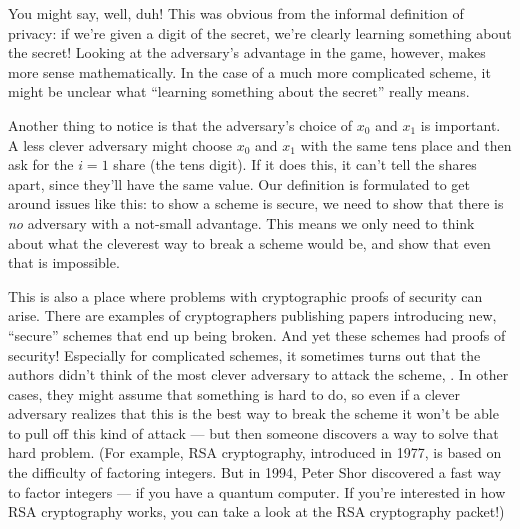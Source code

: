 You might say, well, duh! This was obvious from the informal definition 
of privacy: if we're given a digit of the secret, we're clearly learning 
something about the secret! Looking at the adversary's advantage in the 
game, however, makes more sense mathematically. In the case of a much 
more complicated scheme, it might be unclear what ``learning something 
about the secret'' really means.

Another thing to notice is that the adversary's choice of $x_0$ and $x_1$
is important. A less clever adversary might choose $x_0$ and $x_1$ with 
the same tens place and then ask for the $i=1$ share (the tens digit).
If it does this, it can't tell the shares apart, since they'll have the same
value. Our definition is formulated to get around issues like this: to 
show a scheme is secure, we need to show that there is \emph{no} adversary 
with a not-small advantage. This means we only need to think about what the 
cleverest way to break a scheme would be, and show that even that is 
impossible.

This is also a place where problems with cryptographic proofs of security 
can arise. There are examples of cryptographers publishing papers 
introducing new, ``secure'' schemes that end up being broken. And yet 
these schemes had proofs of security! Especially for complicated schemes, 
it sometimes turns out that the authors didn't think of the most clever 
adversary to attack the scheme, . In other cases, they might assume that 
something is hard to do, so even if a clever adversary realizes that this 
is the best way to break the scheme it won't be able to pull off this 
kind of attack --- but then someone discovers a way to solve that 
hard problem.  
(For example, RSA cryptography, introduced in 1977\cite{rsa},
is based on the difficulty of factoring integers. But in 1994, Peter Shor 
discovered a fast way to factor integers\cite{shor} --- if you have a 
quantum computer. If you're interested in how RSA cryptography works, 
you can take a look at the RSA cryptography packet!)

